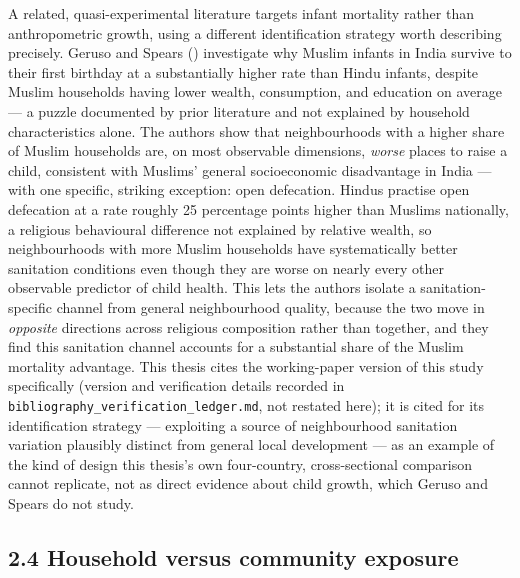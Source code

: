 A related, quasi-experimental literature targets infant mortality rather than anthropometric growth, using a different identification strategy worth describing precisely. Geruso and Spears (\citeyear{GerusoSpears2015}) investigate why Muslim infants in India survive to their first birthday at a substantially higher rate than Hindu infants, despite Muslim households having lower wealth, consumption, and education on average --- a puzzle documented by prior literature and not explained by household characteristics alone. The authors show that neighbourhoods with a higher share of Muslim households are, on most observable dimensions, \textit{worse} places to raise a child, consistent with Muslims' general socioeconomic disadvantage in India --- with one specific, striking exception: open defecation. Hindus practise open defecation at a rate roughly 25 percentage points higher than Muslims nationally, a religious behavioural difference not explained by relative wealth, so neighbourhoods with more Muslim households have systematically better sanitation conditions even though they are worse on nearly every other observable predictor of child health. This lets the authors isolate a sanitation-specific channel from general neighbourhood quality, because the two move in \textit{opposite} directions across religious composition rather than together, and they find this sanitation channel accounts for a substantial share of the Muslim mortality advantage. This thesis cites the working-paper version of this study specifically (version and verification details recorded in \texttt{bibliography\_\allowbreak{}verification\_\allowbreak{}ledger.\allowbreak{}md}, not restated here); it is cited for its identification strategy --- exploiting a source of neighbourhood sanitation variation plausibly distinct from general local development --- as an example of the kind of design this thesis's own four-country, cross-sectional comparison cannot replicate, not as direct evidence about child growth, which Geruso and Spears do not study.

\subsection*{2.4 Household versus community exposure}

